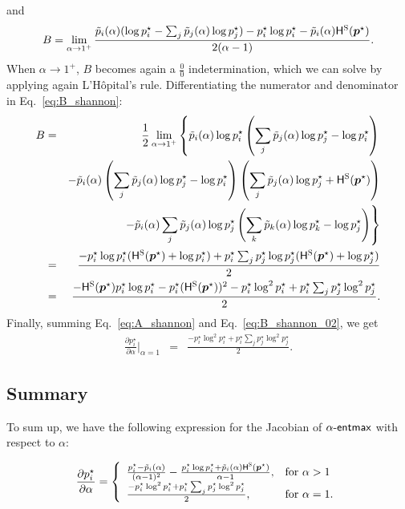 \documentclass[11pt,a4paper]{article}
\newcommand{\HHs}{\mathsf{H}^\textsc{S}}
\newcommand*\entmaxtext{entmax\xspace}
\newcommand*\aentmax[1][\alpha]{\mathop{\mathsf{#1}\textnormal{-}\mathsf{\entmaxtext}}}
\begin{document}
and
\begin{equation}\label{eq:B_shannon}
B = \lim_{\alpha \rightarrow 1^+} \frac{\tilde{p}_i(\alpha) (\log p_i^{\star} - \sum_j \tilde{p}_j(\alpha) \log p_j^{\star}) - p_i^{\star}\log p_i^{\star} - \tilde{p}_i(\alpha) \HHs(\bm{p}^{\star})}{2(\alpha-1)}.
\end{equation}
When $\alpha\rightarrow 1^+$, $B$ becomes again a $\frac{0}{0}$ indetermination, which we can solve by applying again L'H\^opital's rule. Differentiating the numerator and denominator in Eq.~\ref{eq:B_shannon}:
\begin{eqnarray}\label{eq:B_shannon_02}
B &=& \frac{1}{2}\lim_{\alpha \rightarrow 1^+} \left\{ \tilde{p}_i(\alpha) \log p_i^{\star} \left(\sum_j \tilde{p}_j(\alpha) \log p_j^{\star} - \log p_i^{\star}\right) \right. \nonumber\\
&& - \tilde{p}_i(\alpha) \left(\sum_j \tilde{p}_j(\alpha) \log p_j^{\star} - \log p_i^{\star}\right) \left(\sum_j \tilde{p}_j(\alpha) \log p_j^{\star} + \HHs(\bm{p}^{\star})\right) \nonumber\\
&& \left. - \tilde{p}_i(\alpha) \sum_j \tilde{p}_j(\alpha) \log p_j^{\star} \left(\sum_k \tilde{p}_k(\alpha) \log p_k^{\star} - \log p_j^{\star}\right)\right\}\nonumber\\
&=& \frac{-p_i^{\star} \log p_i^{\star}(\HHs(\bm{p}^{\star}) + \log p_i^{\star})
+p_i^{\star} \sum_j p_j^{\star} \log p_j^{\star}(\HHs(\bm{p}^{\star}) + \log p_j^{\star})}{2}\nonumber\\
&=& \frac{-\HHs(\bm{p}^{\star}) p_i^{\star}\log p_i^{\star} - p_i^{\star} (\HHs(\bm{p}^{\star}))^2 - p_i^{\star}\log^2 p_i^{\star} + p_i^{\star} \sum_j p_j^{\star}\log^2 p_j^{\star}}{2}.
\end{eqnarray}
Finally, summing Eq.~\ref{eq:A_shannon} and Eq.~\ref{eq:B_shannon_02}, we get
\begin{eqnarray}\label{eq:gradient_alpha_shannon_02}
    \frac{\partial p_i^{\star}}{\partial \alpha}\bigg|_{\alpha=1} &=& \frac{- p_i^{\star}\log^2 p_i^{\star} + p_i^{\star} \sum_j p_j^{\star}\log^2 p_j^{\star}}{2}.
\end{eqnarray}

\subsection{Summary}

To sum up, we have the following expression for the Jacobian of $\aentmax$ with respect to $\alpha$:

\begin{equation}\label{eq:final_gradient_alpha_supp}
    \frac{\partial p_i^{\star}}{\partial \alpha} =
    \left\{
    \begin{array}{ll}
    \frac{p_i^{\star} - \tilde{p}_i(\alpha)}{(\alpha-1)^2} - \frac{p_i^{\star}\log p_i^{\star} + \tilde{p}_i(\alpha)\HHs(\bm{p}^{\star})}{\alpha-1}, & \text{for $\alpha > 1$}\\
    \frac{- p_i^{\star}\log^2 p_i^{\star} + p_i^{\star} \sum_j p_j^{\star}\log^2 p_j^{\star}}{2}, & \text{for $\alpha = 1$.}
    \end{array}
    \right.
\end{equation}
\end{document}
